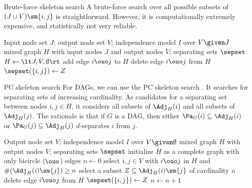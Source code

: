 \begin{frame}{Brute-force skeleton search}
A brute-force search over all possible subsets of $(J \cup V)\sm \{i,j\}$ is straightforward.
However, it is computationally extremely expensive, and statistically not very reliable.

\medskip
\footnotesize
  \begin{algorithmic}[1]
    \Input Input node set $J$; output node set $V$; independence model $I$ over $V \given J$
    \Output mixed graph $H$ with input nodes $J$ and output nodes $V$; separating sets $\sepset$
    \State $H \leftarrow \lt J, V, \emptyset \rt$
      \State add edge $i \ouo j$ to $H$
        \State delete edge $i \ouo j$ from $H$
        \State $\sepset(\{i,j\}) \leftarrow Z$
        \Break
      \EndIf
      \EndFor
    \EndFor
  \end{algorithmic}
\end{frame}

\begin{frame}{PC skeleton search}
For DAGs, we can use the PC skeleton search \cite{SGS2000}.
It searches for separating sets of increasing cardinality. 
As candidates for a separating set between nodes $i,j \in H$, it considers all subsets of $\Adj_H(i)$ and all subsets of $\Adj_H(j)$.
The rationale is that if $G$ is a DAG, then either $\Pa_G(i) \subseteq \Adj_H(i)$ or $\Pa_G(j) \subseteq \Adj_H(j)$ $d$-separates $i$ from $j$.

\medskip
\footnotesize
  \begin{algorithmic}[1]
  \Input Output node set $V$; independence model $I$ over $V \given \emptyset$
  \Output mixed graph $H$ with output nodes $V$; separating sets $\sepset$
  \State initialize $H$ as a complete graph with only bicircle ($\ouo$) edges
  \State $n \leftarrow 0$
    \Repeat
    \Repeat
    \State select $i,j \in V$ with $i \ouo j$ in $H$ and $\#(\Adj_H(i)\sm\{j\}) \ge n$
    \State select a subset $Z \subseteq \Adj_H(i)\sm\{j\}$ of cardinality $n$
      \State delete edge $i \ouo j$ from $H$
      \State $\sepset(\{i,j\}) \leftarrow Z$
    \EndIf
    \State $n \leftarrow n + 1$
  \end{algorithmic}
\end{frame}

